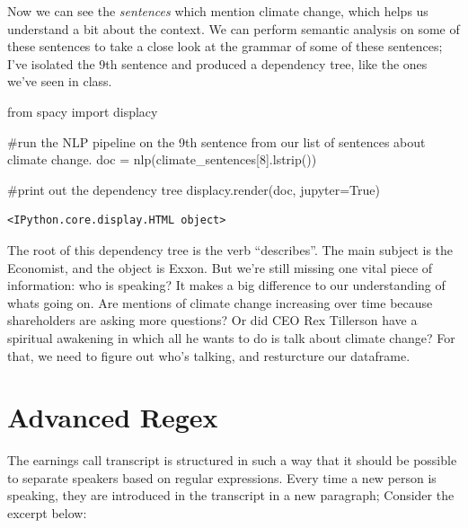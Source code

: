 \documentclass[
  letterpaper,
  DIV=11,
  numbers=noendperiod]{scrreprt}
\newenvironment{Shaded}{\begin{snugshade}}{\end{snugshade}}
\newcommand{\CommentTok}[1]{\textcolor[rgb]{0.37,0.37,0.37}{#1}}
\newcommand{\DecValTok}[1]{\textcolor[rgb]{0.68,0.00,0.00}{#1}}
\newcommand{\ImportTok}[1]{\textcolor[rgb]{0.00,0.46,0.62}{#1}}
\newcommand{\NormalTok}[1]{\textcolor[rgb]{0.00,0.23,0.31}{#1}}
\newcommand{\OperatorTok}[1]{\textcolor[rgb]{0.37,0.37,0.37}{#1}}
\newcommand{\VariableTok}[1]{\textcolor[rgb]{0.07,0.07,0.07}{#1}}
\begin{document}
Now we can see the \emph{sentences} which mention climate change, which
helps us understand a bit about the context. We can perform semantic
analysis on some of these sentences to take a close look at the grammar
of some of these sentences; I've isolated the 9th sentence and produced
a dependency tree, like the ones we've seen in class.

\begin{Shaded}
\begin{Highlighting}[]
\ImportTok{from}\NormalTok{ spacy }\ImportTok{import}\NormalTok{ displacy}

\CommentTok{\#run the NLP pipeline on the 9th sentence from our list of sentences about climate change.}
\NormalTok{doc }\OperatorTok{=}\NormalTok{ nlp(climate\_sentences[}\DecValTok{8}\NormalTok{].lstrip())}

\CommentTok{\#print out the dependency tree}
\NormalTok{displacy.render(doc, jupyter}\OperatorTok{=}\VariableTok{True}\NormalTok{)}
\end{Highlighting}
\end{Shaded}

\begin{verbatim}
<IPython.core.display.HTML object>
\end{verbatim}

The root of this dependency tree is the verb ``describes''. The main
subject is the Economist, and the object is Exxon. But we're still
missing one vital piece of information: who is speaking? It makes a big
difference to our understanding of whats going on. Are mentions of
climate change increasing over time because shareholders are asking more
questions? Or did CEO Rex Tillerson have a spiritual awakening in which
all he wants to do is talk about climate change? For that, we need to
figure out who's talking, and resturcture our dataframe.

\hypertarget{advanced-regex}{%
\section{Advanced Regex}\label{advanced-regex}}

The earnings call transcript is structured in such a way that it should
be possible to separate speakers based on regular expressions. Every
time a new person is speaking, they are introduced in the transcript in
a new paragraph; Consider the excerpt below:
\end{document}
